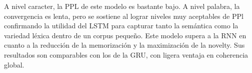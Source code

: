 A nivel caracter, la PPL de este modelo es bastante bajo. A nivel palabra, la convergencia es lenta, pero
se sostiene al lograr niveles muy aceptables de PPl confirmando la utilidad del LSTM para
capturar tanto la semántica como la variedad léxica dentro de un corpus pequeño. Este modelo
supera a la RNN en cuanto a la reducción de la memorización y la maximización de la novelty. 
Sus resultados son comparables con los de la GRU, con ligera ventaja en coherencia global. 


















\clearpage




